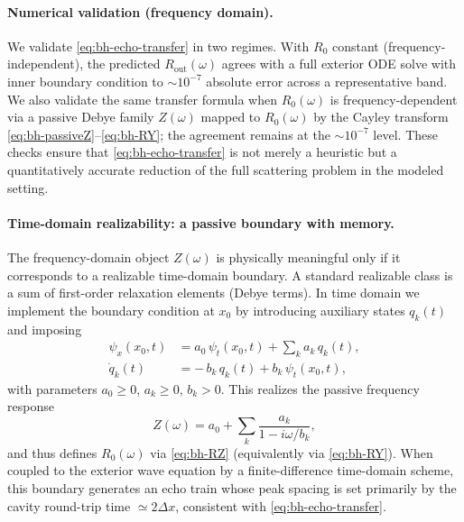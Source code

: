 \paragraph{Numerical validation (frequency domain).}
We validate \eqref{eq:bh-echo-transfer} in two regimes. With $R_0$ constant (frequency-independent), the predicted $R_{\mathrm{out}}(\omega)$ agrees with a full exterior ODE solve with inner boundary condition to $\sim 10^{-7}$ absolute error across a representative band. We also validate the same transfer formula when $R_0(\omega)$ is frequency-dependent via a passive Debye family $Z(\omega)$ mapped to $R_0(\omega)$ by the Cayley transform \eqref{eq:bh-passiveZ}--\eqref{eq:bh-RY}; the agreement remains at the $\sim 10^{-7}$ level. These checks ensure that \eqref{eq:bh-echo-transfer} is not merely a heuristic but a quantitatively accurate reduction of the full scattering problem in the modeled setting.

\paragraph{Time-domain realizability: a passive boundary with memory.}
The frequency-domain object $Z(\omega)$ is physically meaningful only if it corresponds to a realizable time-domain boundary. A standard realizable class is a sum of first-order relaxation elements (Debye terms). In time domain we implement the boundary condition at $x_0$ by introducing auxiliary states $q_k(t)$ and imposing
\begin{align}
  \psi_x(x_0,t) &= a_0\,\psi_t(x_0,t) + \sum_{k} a_k\,q_k(t),
  \label{eq:bh-td-bc}\\
  \dot q_k(t) &= -\,b_k\,q_k(t) + b_k\,\psi_t(x_0,t),
  \label{eq:bh-td-q}
\end{align}
with parameters $a_0\ge 0$, $a_k\ge 0$, $b_k>0$.
This realizes the passive frequency response
\[
  Z(\omega)=a_0+\sum_k \frac{a_k}{1-i\omega/b_k},
\]
and thus defines $R_0(\omega)$ via \eqref{eq:bh-RZ} (equivalently via \eqref{eq:bh-RY}). When coupled to the exterior wave equation by a finite-difference time-domain scheme, this boundary generates an echo train whose peak spacing is set primarily by the cavity round-trip time $\simeq 2\Delta x$, consistent with \eqref{eq:bh-echo-transfer}.

